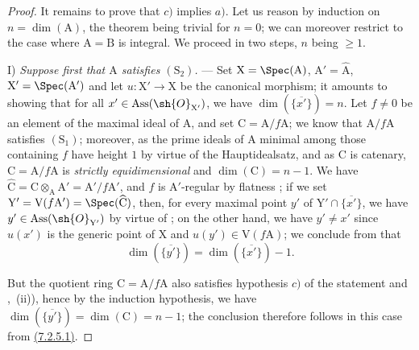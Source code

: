 \begin{proof}

It remains to prove that $c)$ implies $a)$.
Let us reason by induction on $n=\dim(\mathrm{A})$, the theorem being trivial for $n=0$; we can moreover restrict to the case where $\mathrm{A}=\mathrm{B}$ is integral.
We proceed in two steps, $n$ being $\geqslant 1$.

\medskip\noindent
I) \emph{Suppose first that $\mathrm{A}$ satisfies $(\mathrm{S}_2)$.} ---
Set $\mathrm{X}=\Spec(\mathrm{A})$, $\mathrm{A}'=\widehat{\mathrm{A}}$, $\mathrm{X}'=\Spec(\mathrm{A}')$ and let $u:\mathrm{X}'\to\mathrm{X}$ be the canonical morphism; it amounts to showing that for all $x'\in\operatorname{Ass}(\sh{O}_{\mathrm{X}'})$, we have $\dim(\overline{\{x'\}})=n$.
Let $f\neq 0$ be an element of the maximal ideal of $\mathrm{A}$, and set $\mathrm{C}=\mathrm{A}/f\mathrm{A}$; we know  that $\mathrm{A}/f\mathrm{A}$ satisfies $(\mathrm{S}_1)$; moreover, as the prime ideals of $\mathrm{A}$ minimal among those containing $f$ have height $1$ by virtue of the Hauptidealsatz, and as $\mathrm{C}$ is catenary, $\mathrm{C}=\mathrm{A}/f\mathrm{A}$ is \emph{strictly equidimensional} and $\dim(\mathrm{C})=n-1$.
We have $\widehat{\mathrm{C}}=\mathrm{C}\otimes_\mathrm{A}\mathrm{A}'=\mathrm{A}'/f\mathrm{A}'$, and $f$ is $\mathrm{A}'$-regular by flatness ; if we set $\mathrm{Y}'=\mathrm{V}(f\mathrm{A}')=\Spec(\widehat{\mathrm{C}})$, then, for every maximal point $y'$ of $\mathrm{Y}'\cap\overline{\{x'\}}$, we have $y'\in\operatorname{Ass}(\sh{O}_{\mathrm{Y}'})$ by virtue of ; on the other hand, we have $y'\neq x'$ since $u(x')$ is the generic point of $\mathrm{X}$  and $u(y')\in\mathrm{V}(f\mathrm{A})$; we conclude from  that
\[
  \dim(\overline{\{y'\}})=\dim(\overline{\{x'\}})-1.
  \tag{7.2.5.1}
\label{IV.7.2.5.1}
\]

But the quotient ring $\mathrm{C}=\mathrm{A}/f\mathrm{A}$ also satisfies hypothesis $c)$ of the statement  and ,~(ii)), hence by the induction hypothesis, we have $\dim(\overline{\{y'\}})=\dim(\mathrm{C})=n-1$; the conclusion therefore follows in this case from {\hyperlink{ega4.c04.eq.7-2-5-1}{(7.2.5.1)}}.


\end{proof}
